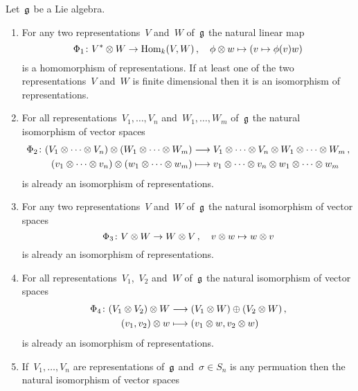\begin{proposition}
  \label{list of homomorphism of representations}
  Let~$\mathfrak{g}$ be a Lie algebra.
 \begin{enumerate}[leftmargin=*]
    \item
      For any two representations~$V$ and~$W$ of~$\mathfrak{g}$ the natural linear map
      \[
        \Phi_1
        \colon
        V^* \otimes W
        \to
        \operatorname{Hom}_k(V,W) \,,
        \quad
        \phi \otimes w
        \mapsto
        (v \mapsto \phi(v) w)
      \]
      is a homomorphism of representations.
      If at least one of the two representations~$V$ and~$W$ is finite dimensional then it is an isomorphism of representations.
    \item
      For all representations~$V_1, \dotsc, V_n$ and~$W_1, \dotsc, W_m$ of~$\mathfrak{g}$ the natural isomorphism of vector spaces
      \begin{align*}
        \Phi_2
        \colon
        (V_1 \otimes \dotsb \otimes V_n) \otimes (W_1 \otimes \dotsb \otimes W_m)
        &\longrightarrow
        V_1 \otimes \dotsb \otimes V_n \otimes W_1 \otimes \dotsb \otimes W_m \,,
        \\
        (v_1 \otimes \dotsb \otimes v_n) \otimes (w_1 \otimes \dotsb \otimes w_m)
        &\longmapsto
        v_1 \otimes \dotsb \otimes v_n \otimes w_1 \otimes \dotsb \otimes w_m
      \end{align*}
      is already an isomorphism of representations.
    \item
      For any two representations~$V$ and~$W$ of~$\mathfrak{g}$ the natural isomorphism of vector spaces
      \[
        \Phi_3
        \colon
        V \otimes W
        \to
        W \otimes V \,,
        \quad
        v \otimes w
        \mapsto
        w \otimes v
      \]
      is already an isomorphism of representations.
    \item
      For all representations~$V_1$,~$V_2$ and~$W$ of~$\mathfrak{g}$ the natural isomorphism of vector spaces
      \begin{align*}
        \Phi_4
        \colon
        (V_1 \otimes V_2) \otimes W
        &\longrightarrow
        (V_1 \otimes W) \oplus (V_2 \otimes W) \,,
        \\
        (v_1, v_2) \otimes w
        &\longmapsto
        (v_1 \otimes w, v_2 \otimes w)
      \end{align*}
      is already an isomorphism of representations.
    \item
      If~$V_1, \dotsc, V_n$ are representations of~$\mathfrak{g}$ and~$\sigma \in S_n$ is any permuation then the natural isomorphism of vector spaces

\end{enumerate}
\end{proposition}
